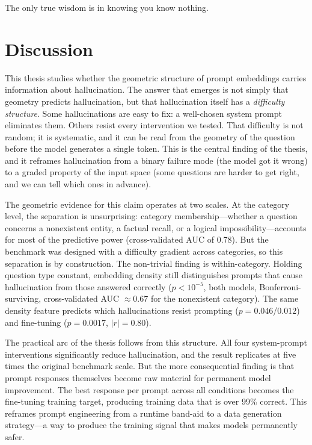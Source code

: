 \begin{savequote}[75mm]
The only true wisdom is in knowing you know nothing.
\end{savequote}

\chapter{Discussion}
\label{ch:discussion}

This thesis studies whether the geometric structure of prompt embeddings carries information about hallucination. The answer that emerges is not simply that geometry predicts hallucination, but that hallucination itself has a \emph{difficulty structure}. Some hallucinations are easy to fix: a well-chosen system prompt eliminates them. Others resist every intervention we tested. That difficulty is not random; it is systematic, and it can be read from the geometry of the question before the model generates a single token. This is the central finding of the thesis, and it reframes hallucination from a binary failure mode (the model got it wrong) to a graded property of the input space (some questions are harder to get right, and we can tell which ones in advance).

The geometric evidence for this claim operates at two scales. At the category level, the separation is unsurprising: category membership---whether a question concerns a nonexistent entity, a factual recall, or a logical impossibility---accounts for most of the predictive power (cross-validated AUC of 0.78). But the benchmark was designed with a difficulty gradient across categories, so this separation is by construction. The non-trivial finding is within-category. Holding question type constant, embedding density still distinguishes prompts that cause hallucination from those answered correctly ($p < 10^{-5}$, both models, Bonferroni-surviving, cross-validated AUC $\approx 0.67$ for the nonexistent category). The same density feature predicts which hallucinations resist prompting ($p = 0.046$/$0.012$) and fine-tuning ($p = 0.0017$, $|r| = 0.80$). 

The practical arc of the thesis follows from this structure. All four system-prompt interventions significantly reduce hallucination, and the result replicates at five times the original benchmark scale. But the more consequential finding is that prompt responses themselves become raw material for permanent model improvement. The best response per prompt across all conditions becomes the fine-tuning training target, producing training data that is over 99\% correct. This reframes prompt engineering from a runtime band-aid to a data generation strategy---a way to produce the training signal that makes models permanently safer.

